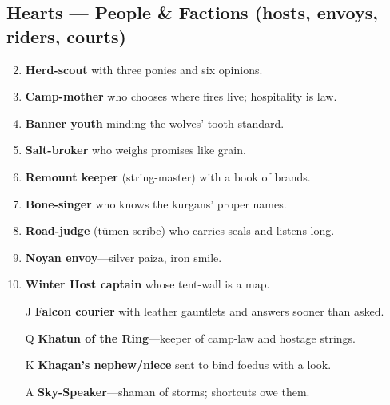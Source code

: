 \subsection*{Hearts --- People \& Factions (hosts, envoys, riders, courts)}
\begin{enumerate}
\setcounter{enumi}{1}
\item \textbf{Herd-scout} with three ponies and six opinions.
\item \textbf{Camp-mother} who chooses where fires live; hospitality is law.
\item \textbf{Banner youth} minding the wolves' tooth standard.
\item \textbf{Salt-broker} who weighs promises like grain.
\item \textbf{Remount keeper} (string-master) with a book of brands.
\item \textbf{Bone-singer} who knows the kurgans' proper names.
\item \textbf{Road-judge} (tümen scribe) who carries seals and listens long.
\item \textbf{Noyan envoy}---silver paiza, iron smile.
\item \textbf{Winter Host captain} whose tent-wall is a map.
\item[J] \textbf{Falcon courier} with leather gauntlets and answers sooner than asked.
\item[Q] \textbf{Khatun of the Ring}---keeper of camp-law and hostage strings.
\item[K] \textbf{Khagan's nephew/niece} sent to bind foedus with a look.
\item[A] \textbf{Sky-Speaker}---shaman of storms; shortcuts owe them.
\end{enumerate}


